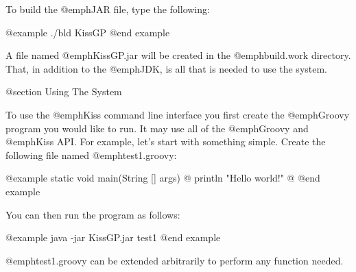 To build the @emph{JAR} file, type the following:

@example
./bld KissGP
@end example

A file named @emph{KissGP.jar} will be created in the @emph{build.work}
directory.  That, in addition to the @emph{JDK}, is all that is needed to
use the system.

@section Using The System

To use the @emph{Kiss} command line interface you first create the
@emph{Groovy} program you would like to run.  It may use all of the
@emph{Groovy} and @emph{Kiss} API.  For example, let's start with
something simple.  Create the following file named
@emph{test1.groovy}:

@example
static void main(String [] args) @{
    println "Hello world!"
@}
@end example

You can then run the program as follows:

@example
java -jar KissGP.jar test1
@end example

@emph{test1.groovy} can be extended arbitrarily to perform any function needed.

